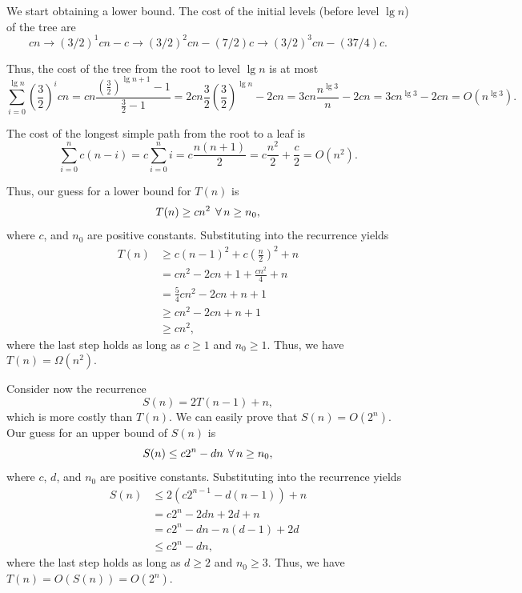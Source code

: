 \begin{enumerate}
\begin{framed}
We start obtaining a lower bound. The cost of the initial levels (before level
$\lg n$) of the tree are
\[
cn \rightarrow (3/2)^1 cn - c \rightarrow (3/2)^2 cn - (7/2) c \rightarrow (3/2)^3 cn - (37/4) c.
\]

Thus, the cost of the tree from the root to level $\lg n$ is at most
\[
  \sum_{i = 0}^{\lg n} \left(\frac{3}{2}\right)^i cn
  = cn \frac{\left(\frac{3}{2}\right)^{\lg n + 1} - 1}{\frac{3}{2} - 1}
  = 2cn \frac{3}{2} \left(\frac{3}{2}\right)^{\lg n} - 2cn
  = 3cn \frac{n^{\lg 3}}{n} - 2cn
  = 3cn^{\lg 3} - 2cn
  = O(n^{\lg 3}).
\]

The cost of the longest simple path from the root to a leaf is
\[
  \sum_{i = 0}^{n} c(n - i) = c \sum_{i = 0}^{n} i = c \frac{n (n + 1)}{2}
                            = c \frac{n^2}{2} + \frac{c}{2} = O(n^2).
\]

Thus, our guess for a lower bound for $T(n)$ is
\[
T(n) \ge cn^2 \; \operatorname{\forall} n \ge n_0,
\]
where $c$, and $n_0$ are positive constants. Substituting into the
recurrence yields
\begin{equation*}
\begin{aligned}
  T(n) &\ge c (n - 1)^2 + c\left(\frac{n}{2}\right)^2 + n\\
       &=   cn^2 - 2cn + 1 + \frac{cn^2}{4} + n\\
       &=   \frac{5}{4} cn^2 -2cn + n + 1\\
       &\ge cn^2 -2cn + n + 1\\
       &\ge cn^2,
\end{aligned}
\end{equation*}
where the last step holds as long as $c \ge 1$ and $n_0 \ge 1$. Thus, we have
$T(n) = \Omega(n^2)$.

Consider now the recurrence
\[
S(n) = 2T(n - 1) + n,
\]
which is more costly than $T(n)$. We can easily prove that $S(n) = O(2^n)$. Our
guess for an upper bound of $S(n)$ is
\[
S(n) \le c 2^n - dn \; \operatorname{\forall} n \ge n_0,
\]
where $c$, $d$, and $n_0$ are positive constants. Substituting into the
recurrence yields
\begin{equation*}
\begin{aligned}
  S(n) &\le 2 (c 2^{n - 1} - d(n - 1)) + n\\
       &=   c2^n - 2dn + 2d + n\\
       &=   c2^n - dn - n(d - 1) + 2d\\
       &\le c 2^n - dn,
\end{aligned}
\end{equation*}
where the last step holds as long as $d \ge 2$ and $n_0 \ge 3$. Thus, we have
$T(n) = O(S(n)) = O(2^n)$.


\end{framed}
\end{enumerate}

